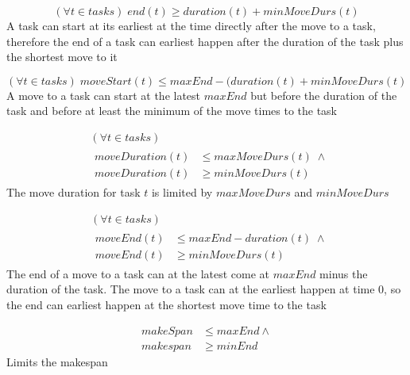  \begin{equation}\label{eq:62}
 (\forall t \in tasks) \; end(t) \ge duration(t) + minMoveDurs(t)\end{equation}
 A task can start at its earliest at the time directly after the move to a task, therefore the end of a task can earliest happen after the duration of the task plus the shortest move to it
 
 \begin{equation}\label{eq:63}
 (\forall t \in tasks) \; moveStart(t) \le maxEnd-(duration(t)+minMoveDurs(t)\end{equation}
 A move to a task can start at the latest $maxEnd$ but before the duration of the task and before at least the minimum of the move times to the task
 
 \begin{equation}
 \begin{aligned}\label{eq:64}
 &(\forall t \in tasks)\\
 &\begin{aligned}
 moveDuration(t) &\le maxMoveDurs(t) \; \land\\
 moveDuration(t) &\ge minMoveDurs(t)
 \end{aligned}
 \end{aligned}
 \end{equation}
 The move duration for task $t$ is limited by $maxMoveDurs$ and $minMoveDurs$
 
 \begin{equation}
 \begin{aligned}\label{eq:65}
 &(\forall t \in tasks)\\
 &\begin{aligned}
 moveEnd(t) &\le maxEnd - duration(t) \; \land\\
 moveEnd(t) &\ge minMoveDurs(t)
 \end{aligned}
 \end{aligned}
 \end{equation}
 The end of a move to a task can at the latest come at $maxEnd$ minus the duration of the task. The move to a task can at the earliest happen at time 0, so the end can earliest happen at the shortest move time to the task
 
 \begin{equation}\label{eq:66}
 \begin{aligned}
 makeSpan &\le maxEnd \land\\
 makespan &\ge minEnd
 \end{aligned}
 \end{equation}
 Limits the makespan
 
